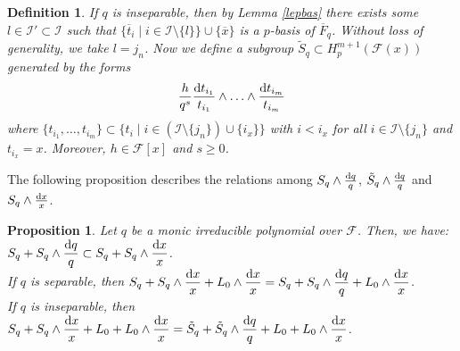\documentclass[times,10pt]{amsart}
\newcommand{\dd}{{\rm d}}
\newcommand{\F}{\ensuremath{\mathcal{F}}}
\newcommand{\I}{\ensuremath{\mathcal{I}}}
\newtheorem{defn}[thm]{Definition}%
\newtheorem{prop}[thm]{Proposition}%
\begin{document}
\begin{defn}\label{dein}
    If $q$ is inseparable, then by  Lemma \ref{lepbas}  there exists some $l\in \I'\subset \I$ such that $ \{ \overline{t}_i\mid {i\in \I\setminus\{l\}} \}\cup \{\overline{x}\}$ is a $p$-basis of $\overline{F}_q$. {Without}  loss of generality, we take $ l=j_n$. Now we define a subgroup $\tilde{S}_q\subset  H_p^{m+1}(\F(x))$ generated by the forms $$ \displaystyle{ \frac{h}{q^s} \frac{\dd t_{i_1}}{t_{i_1}}\wedge \ldots\wedge \frac{\dd t_{i_m}}{t_{i_m}}}$$ where $ \{ t_{i_1}, \ldots, t_{i_m}\}\subset \{ t_i\mid i\in (\I\setminus \{j_n\})\cup \{i_x\}\}$ with   $i<i_x$ for all $i\in \I\setminus\{j_n\}$ and $t_{i_x}=x$. Moreover, $h\in \F[x]$ and $s\geq 0$.
\end{defn}
The following proposition  describes the relations among $ S_q\wedge \frac{\dd q}{q}$, $\tilde{S}_q\wedge \frac{\dd q}{q}$ and ${S}_q\wedge \frac{\dd x}{x}$.
\begin{prop}\label{prsei} Let $q$ be a  monic irreducible polynomial over $\F$. Then, we have:\\

   $\displaystyle{S_q+ S_q\wedge \frac{\dd q}{q} \subset S_q+S_q\wedge \frac{\dd x}{x}}$.\\

  If $q$ is separable, then $ \displaystyle{S_q+ S_q\wedge \frac{\dd x}{x}+ L_0\wedge \frac{\dd x}{x}= S_q+ S_q\wedge \frac{\dd q}{q}+ L_0\wedge \frac{\dd x}{x}}$.\\

 If $q$ is inseparable, then $ \displaystyle{S_q+ S_q\wedge \frac{\dd x}{x}+L_0+ L_0\wedge \frac{\dd x}{x}= \tilde{S}_q+\tilde{S}_q\wedge \frac{\dd q}{q}+L_0+L_0\wedge \frac{\dd x}{x}}$.
    \end{prop}
\end{document}
